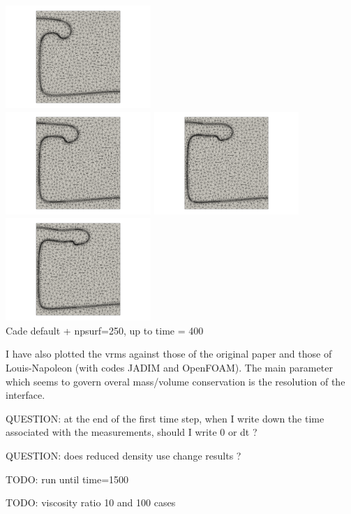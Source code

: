 \begin{center}
\includegraphics[width=5.5cm]{python_codes/fieldstone_95/results/npsurf250/grid0250.png}\\
\includegraphics[width=5.5cm]{python_codes/fieldstone_95/results/npsurf250/grid0300.png}
\includegraphics[width=5.5cm]{python_codes/fieldstone_95/results/npsurf250/grid0350.png}
\includegraphics[width=5.5cm]{python_codes/fieldstone_95/results/npsurf250/grid0400.png}\\
{\captionfont Cade default + npsurf=250, up to time = 400}
\end{center}


I have also plotted the vrms against those of the original paper and those of Louis-Napoleon \etal \cite{logb20}
(with codes JADIM and OpenFOAM). 
The main parameter which seems to govern overal mass/volume conservation is the resolution of the interface. 

QUESTION: at the end of the first time step, when I write down the time associated with the measurements, should I write 0
or dt ?

QUESTION: does reduced density use change results ?

TODO: run until time=1500

TODO: viscosity ratio 10 and 100 cases

